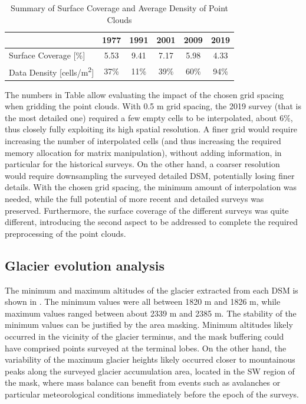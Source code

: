 {\begin{table}[ht]
  \centering
  \caption{Summary of Surface Coverage and Average Density of Point Clouds}
  \label{tab:2:pcd_surface_coverage}
  \begin{tabular}{lccccc}
    \hline
    & 1977 & 1991 & 2001 & 2009 & 2019 \\
    \hline
    Surface Coverage [\%] & 5.53 & 9.41 & 7.17 & 5.98 & 4.33 \\
    Data Density [cells/m\textsuperscript{2}] & 37\% & 11\% & 39\% & 60\% & 94\% \\
    \hline
  \end{tabular}
\end{table}

The numbers in Table  allow evaluating the impact of the chosen grid spacing when gridding the point clouds. 
With 0.5 m grid spacing, the 2019 survey (that is the most detailed one) required a few empty cells to be interpolated, about 6\%, thus closely fully exploiting its high spatial resolution. 
A finer grid would require increasing the number of interpolated cells (and thus increasing the required memory allocation for matrix manipulation), without adding information, in particular for the historical surveys.
On the other hand, a coarser resolution would require downsampling the surveyed detailed DSM, potentially losing finer details. 
With the chosen grid spacing, the minimum amount of interpolation was needed, while the full potential of more recent and detailed surveys was preserved. 
Furthermore, the surface coverage of the different surveys was quite different, introducing the second aspect to be addressed to complete the required preprocessing of the point clouds.

\subsection{Glacier evolution analysis}{\label{sec:2:res_glacier_evolution}

The minimum and maximum altitudes of the glacier extracted from each DSM is shown in .
The minimum values were all between 1820 m and 1826 m, while maximum values ranged between about 2339 m and 2385 m. 
The stability of the minimum values can be justified by the area masking. 
Minimum altitudes likely occurred in the vicinity of the glacier terminus, and the mask buffering could have comprised points surveyed at the terminal lobes.
On the other hand, the variability of the maximum glacier heights likely occurred closer to mountainous peaks along the surveyed glacier accumulation area, located in the SW region of the mask, where mass balance can benefit from events such as avalanches or particular meteorological conditions immediately before the epoch of the surveys.

}}
